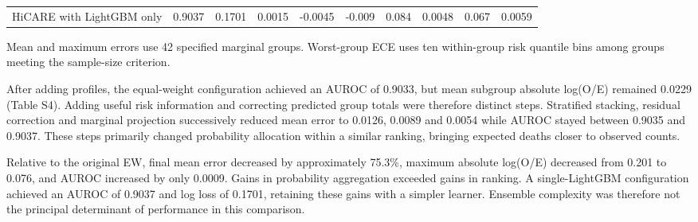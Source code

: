 \documentclass[11pt,a4paper]{article}
\begin{document}
\begin{landscape}
\begin{longtable}{@{}L{72.00mm}L{18.67mm}L{18.67mm}L{18.67mm}L{18.67mm}L{18.67mm}L{18.67mm}L{18.67mm}L{18.67mm}L{18.67mm}@{}}
HiCARE with LightGBM only & 0.9037 & 0.1701 & 0.0015 & -0.0045 & -0.009 & 0.084 & 0.0048 & 0.067 & 0.0059 \\
\end{longtable}\endgroup
{\small Mean and maximum errors use 42 specified marginal groups. Worst-group ECE uses ten within-group risk quantile bins among groups meeting the sample-size criterion.\par}
After adding profiles, the equal-weight configuration achieved an AUROC of 0.9033, but mean subgroup absolute log(O/E) remained 0.0229 (Table S4). Adding useful risk information and correcting predicted group totals were therefore distinct steps. Stratified stacking, residual correction and marginal projection successively reduced mean error to 0.0126, 0.0089 and 0.0054 while AUROC stayed between 0.9035 and 0.9037. These steps primarily changed probability allocation within a similar ranking, bringing expected deaths closer to observed counts.

Relative to the original EW, final mean error decreased by approximately 75.3\%, maximum absolute log(O/E) decreased from 0.201 to 0.076, and AUROC increased by only 0.0009. Gains in probability aggregation exceeded gains in ranking. A single-LightGBM configuration achieved an AUROC of 0.9037 and log loss of 0.1701, retaining these gains with a simpler learner. Ensemble complexity was therefore not the principal determinant of performance in this comparison.


\end{landscape}
\clearpage
\begingroup\fontsize{8}{9.5}\selectfont\setlength{\tabcolsep}{1.1mm}\renewcommand{\arraystretch}{1.2}
\end{document}
